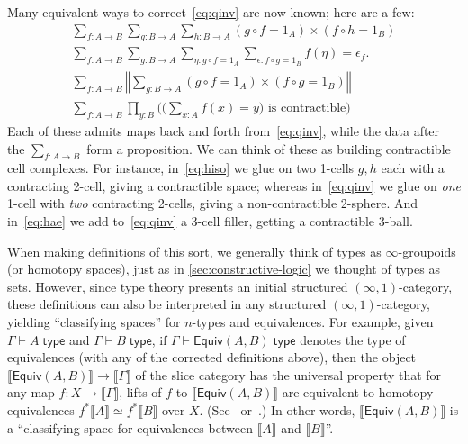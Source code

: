 \documentclass[10pt]{article}
\def\oo{\ensuremath{\infty}}
\def\io{\ensuremath{(\oo,1)}}
\def\ty{\;\mathsf{type}}
\def\m#1{\llbracket#1\rrbracket}
\def\types{\vdash}
\def\equiv{\mathsf{Equiv}}
\numberwithin{equation}{section}
\newcommand{\trunc}[2]{\mathopen{}\left\Vert #2\right\Vert_{#1}\mathclose{}}
\newcommand{\brck}[1]{\trunc{}{#1}}
\begin{document}
Many equivalent ways to correct~\eqref{eq:qinv} are now known; here are a few: %
\begin{gather}
  \textstyle\sum_{f:A\to B} \sum_{g:B\to A} \sum_{h:B\to A} (g\circ f = 1_A)\times (f\circ h = 1_B) \label{eq:hiso}\\
  \textstyle\sum_{f:A\to B} \sum_{g:B\to A} \sum_{\eta:g\circ f = 1_A}\sum_{\epsilon: f\circ g = 1_B} f(\eta) = \epsilon_f.\label{eq:hae}\\
  \textstyle\sum_{f:A\to B} \brck{\sum_{g:B\to A} (g\circ f = 1_A)\times (f\circ g = 1_B)}\\
  \textstyle\sum_{f:A\to B} \prod_{y:B} \Big(\big(\sum_{x:A} f(x)=y\big) \text{ is contractible}\Big)
\end{gather}
Each of these admits maps back and forth from~\eqref{eq:qinv},
while the data after the $\sum_{f:A\to B}$ form a proposition.
We can think of these as building contractible cell complexes.
For instance, in~\eqref{eq:hiso} we glue on two 1-cells $g,h$ each with a contracting 2-cell, giving a contractible space; whereas in~\eqref{eq:qinv} we glue on \emph{one} 1-cell with \emph{two} contracting 2-cells, giving a non-contractible 2-sphere.
And in~\eqref{eq:hae} we add to~\eqref{eq:qinv} a 3-cell filler, getting a contractible 3-ball.

When making definitions of this sort, we generally think of types as \oo-groupoids (or homotopy spaces), just as in \cref{sec:constructive-logic} we thought of types as sets.
However, since type theory presents an initial structured \io-category, these definitions can also be interpreted in any structured \io-category, yielding ``classifying spaces'' for $n$-types and equivalences.
For example, given $\Gamma\types A\ty$ and $\Gamma\types B\ty$, if $\Gamma\types\equiv(A,B)\ty$ denotes the type of equivalences (with any of the corrected definitions above), then the object $\m{\equiv(A,B)} \to \m\Gamma$ of the slice category has the universal property that for any map $f:X\to\m\Gamma$, lifts of $f$ to $\m{\equiv(A,B)}$ are equivalent to homotopy equivalences $f^*\m A \simeq f^* \m B$ over $X$.
(See~\cite[\S3]{klv:ssetmodel} or~\cite[\S4]{shulman:elreedy}.)
In other words, $\m{\equiv(A,B)}$ is a ``classifying space for equivalences between $\m A$ and $\m B$''.
\end{document}
